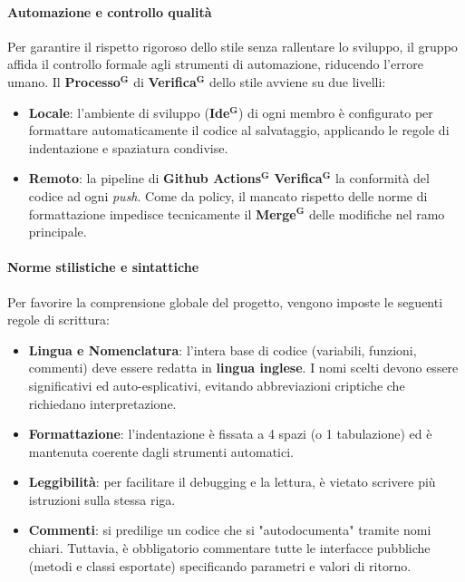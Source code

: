 \documentclass[a4paper,12pt]{article}
\newcommand{\term}[1]{\textbf{#1}$^\mathbf{G}$}
\begin{document}
\paragraph{Automazione e controllo qualità}
Per garantire il rispetto rigoroso dello stile senza rallentare lo sviluppo, il gruppo affida il controllo formale agli strumenti di automazione, riducendo l'errore umano.
Il \term{Processo} di \term{Verifica} dello stile avviene su due livelli:
\begin{itemize}
    \item \textbf{Locale}: l'ambiente di sviluppo (\term{Ide}) di ogni membro è configurato per formattare automaticamente il codice al salvataggio, applicando le regole di indentazione e spaziatura condivise.
    \item \textbf{Remoto}: la pipeline di \textbf{\term{Github Actions}} \term{Verifica} la conformità del codice ad ogni \textit{push}. Come da policy, il mancato rispetto delle norme di formattazione impedisce tecnicamente il \term{Merge} delle modifiche nel ramo principale.
\end{itemize}

\paragraph{Norme stilistiche e sintattiche}
Per favorire la comprensione globale del progetto, vengono imposte le seguenti regole di scrittura:
\begin{itemize}
    \item \textbf{Lingua e Nomenclatura}: l'intera base di codice (variabili, funzioni, commenti) deve essere redatta in \textbf{lingua inglese}. I nomi scelti devono essere significativi ed auto-esplicativi, evitando abbreviazioni criptiche che richiedano interpretazione.
    \item \textbf{Formattazione}: l'indentazione è fissata a 4 spazi (o 1 tabulazione) ed è mantenuta coerente dagli strumenti automatici.
    \item \textbf{Leggibilità}: per facilitare il debugging e la lettura, è vietato scrivere più istruzioni sulla stessa riga.
    \item \textbf{Commenti}: si predilige un codice che si "autodocumenta" tramite nomi chiari. Tuttavia, è obbligatorio commentare tutte le interfacce pubbliche (metodi e classi esportate) specificando parametri e valori di ritorno.
\end{itemize}
\end{document}
